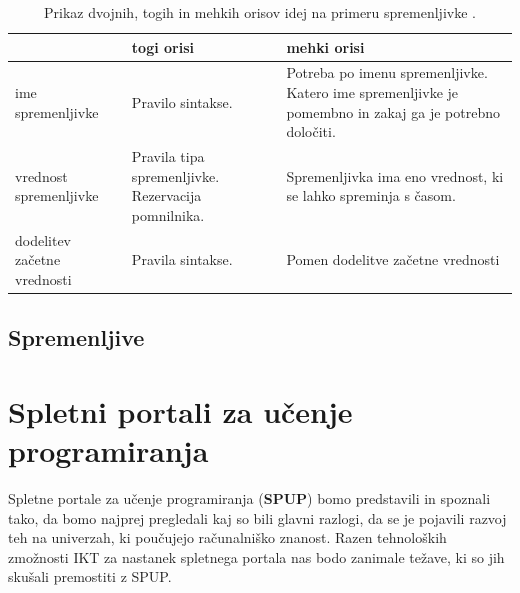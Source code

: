 \begin{table}[!htb]

\caption{Prikaz dvojnih, togih in mehkih orisov idej na primeru
  spremenljivke \cite{guideTCS}. }
\label{tab:koncept_spremenljivka}
\begin{tabular}{
  | p{} |
  p{} |
  p{} | }
  \hline
  & \textbf{togi orisi} & \textbf{mehki orisi}\\
  \hline
  ime spremenljivke & Pravilo sintakse. & Potreba po imenu
                                          spremenljivke. Katero ime
                                          spremenljivke je pomembno in
                                          zakaj ga je potrebno
                                          določiti.\\
  \hline
  vrednost spremenljivke & Pravila tipa spremenljivke. Rezervacija
                           pomnilnika. & Spremenljivka ima eno
                                         vrednost, ki se lahko
                                         spreminja s časom.\\
  \hline
  dodelitev začetne vrednosti & Pravila sintakse. & Pomen dodelitve
                                                  začetne vrednosti\\
  \hline

\end{tabular}
\end{table}

\subsection{Spremenljive}
\label{sec:spremenljivke}








\section{Spletni portali za učenje programiranja}
\label{sec:SPUP}

Spletne portale za učenje programiranja (\textbf{SPUP}) bomo
predstavili in spoznali tako, da bomo najprej pregledali kaj so bili
glavni razlogi, da se je pojavili razvoj teh na univerzah, ki
poučujejo računalniško znanost. Razen tehnoloških zmožnosti IKT za
nastanek spletnega portala nas bodo zanimale težave, ki so jih skušali
premostiti z SPUP.

